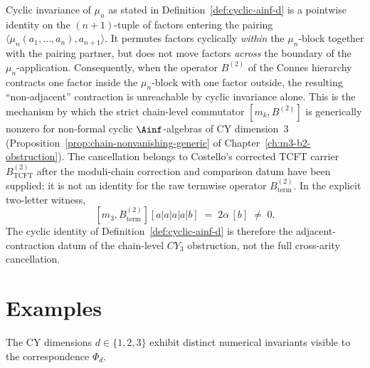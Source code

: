 \begin{remark}
\label{rem:cyclic-adjacent-only}
Cyclic invariance of $\mu_n$ as stated in
Definition~\ref{def:cyclic-ainf-d} is a pointwise identity on the
$(n+1)$-tuple of factors entering the pairing
$\langle \mu_n(a_1, \ldots, a_n), a_{n+1} \rangle$. It permutes
factors cyclically \emph{within} the $\mu_n$-block together with the
pairing partner, but does not move factors \emph{across} the boundary
of the $\mu_n$-application. Consequently, when the operator
$B^{(2)}$ of the Connes hierarchy contracts one factor inside the
$\mu_n$-block with one factor outside, the resulting ``non-adjacent''
contraction is unreachable by cyclic invariance alone. This is the
mechanism by which the strict chain-level commutator $[m_k, B^{(2)}]$
is generically nonzero for non-formal cyclic $\Ainf$-algebras of CY
dimension~$3$ (Proposition~\ref{prop:chain-nonvanishing-generic} of
Chapter~\ref{ch:m3-b2-obstruction}). The cancellation belongs to
Costello's corrected TCFT carrier $B^{(2)}_{\mathrm{TCFT}}$ after the
moduli-chain correction and comparison datum have been supplied; it is
not an identity for the raw termwise operator $B^{(2)}_{\mathrm{term}}$.
In the explicit two-letter witness,
\[
 [m_3,B^{(2)}_{\mathrm{term}}][a|a|a|a|b]
 \;=\; 2\alpha\,[b] \;\neq\;0 .
\]
The cyclic identity of Definition~\ref{def:cyclic-ainf-d} is therefore
the adjacent-contraction datum of the chain-level $CY_3$ obstruction,
not the full cross-arity cancellation.
\end{remark}

\section{Examples}
\label{sec:cyclic-ainf-examples}

The CY dimensions $d \in \{1, 2, 3\}$ exhibit distinct numerical
invariants visible to the correspondence $\Phi_d$.

